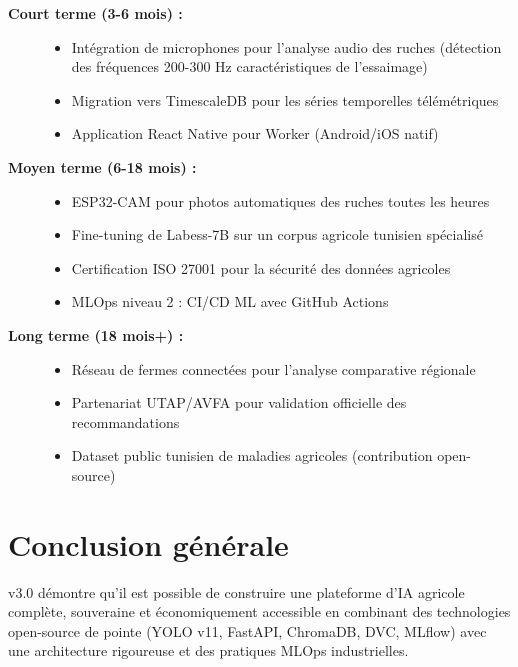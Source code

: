 \begin{tcolorbox}[infobox, title={Feuille de route v4.0}]
\begin{description}
  \item[\textbf{Court terme (3-6 mois) :}]
    \begin{itemize}
      \item Intégration de microphones pour l'analyse audio des ruches
            (détection des fréquences 200-300 Hz caractéristiques de l'essaimage)
      \item Migration vers TimescaleDB pour les séries temporelles télémétriques
      \item Application React Native pour Worker (Android/iOS natif)
    \end{itemize}
  \item[\textbf{Moyen terme (6-18 mois) :}]
    \begin{itemize}
      \item ESP32-CAM pour photos automatiques des ruches toutes les heures
      \item Fine-tuning de Labess-7B sur un corpus agricole tunisien spécialisé
      \item Certification ISO 27001 pour la sécurité des données agricoles
      \item MLOps niveau 2 : CI/CD ML avec GitHub Actions
    \end{itemize}
  \item[\textbf{Long terme (18 mois+) :}]
    \begin{itemize}
      \item Réseau de fermes connectées pour l'analyse comparative régionale
      \item Partenariat UTAP/AVFA pour validation officielle des recommandations
      \item Dataset public tunisien de maladies agricoles (contribution open-source)
    \end{itemize}
\end{description}
\end{tcolorbox}

\section{Conclusion générale}

\farmAI{} v3.0 démontre qu'il est possible de construire une plateforme d'IA agricole
complète, souveraine et économiquement accessible en combinant des technologies
open-source de pointe (YOLO v11, FastAPI, ChromaDB, DVC, MLflow) avec une architecture
rigoureuse et des pratiques MLOps industrielles.


